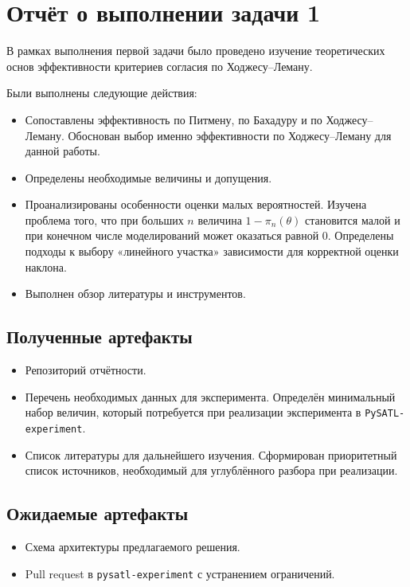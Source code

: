 ﻿\section{Отчёт о выполнении задачи 1}
\label{sec:task1}

В рамках выполнения первой задачи было проведено изучение теоретических основ эффективности
критериев согласия по Ходжесу--Леману.

Были выполнены следующие действия:
\begin{itemize}
    \item Сопоставлены эффективность по Питмену, по Бахадуру и по Ходжесу--Леману.
    Обоснован выбор именно эффективности по Ходжесу--Леману для данной работы.
    \item Определены необходимые величины и допущения.
    \item Проанализированы особенности оценки малых вероятностей. Изучена проблема
    того, что при больших $n$ величина $1-\pi_n(\theta)$ становится малой и при
    конечном числе моделирований может оказаться равной $0$. Определены подходы к
    выбору «линейного участка» зависимости для корректной оценки наклона.
    \item Выполнен обзор литературы и инструментов.
\end{itemize}

\subsection{Полученные артефакты}

\begin{itemize}
  \item Репозиторий отчётности.
  \item Перечень необходимых данных для эксперимента. Определён минимальный набор величин, который потребуется при реализации эксперимента в \texttt{PySATL-experiment}.
  \item Список литературы для дальнейшего изучения. Сформирован приоритетный список источников, необходимый для углублённого разбора при реализации.
\end{itemize}

\subsection{Ожидаемые артефакты}

\begin{itemize}
  \item Схема архитектуры предлагаемого решения.
  \item Pull request в \texttt{pysatl-experiment} с устранением ограничений.
\end{itemize}

\clearpage
